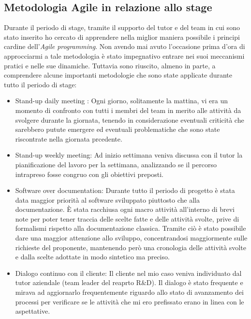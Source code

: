\subsection{Metodologia Agile in relazione allo stage}
Durante il periodo di stage, tramite il supporto del tutor e del team in cui sono stato inserito ho cercato di apprendere nella miglior maniera possibile i principi cardine dell'\textit{Agile programming}. Non avendo mai avuto l'occasione prima d'ora di approcciarmi a tale metodologia è stato impegnativo entrare nei suoi meccanismi pratici e nelle sue dinamiche. Tuttavia sono riuscito, almeno in parte, a comprendere alcune importanti metodologie che sono state applicate durante tutto il periodo di stage:
\begin{itemize}
	\item Stand-up daily meeting : Ogni giorno, solitamente la mattina, vi era un momento di confronto con tutti i membri del team in merito alle attività da svolgere durante la giornata, tenendo in considerazione eventuali criticità che sarebbero putute emergere ed eventuali problematiche che sono state riscontrate nella giornata prcedente.
	\item Stand-up weekly meeting: Ad inizio settimana veniva discussa con il tutor la pianificazione del lavoro per la settimana, analizzando se il percorso intrapreso fosse congruo con gli obiettivi preposti.
	\item Software over documentation: Durante tutto il periodo di progetto è stata data maggior  priorità al software sviluppato piuttosto che alla documentazione. È stata racchiusa ogni macro attività all'interno di brevi note per poter tener traccia delle scelte fatte e delle attività svolte, prive di formalismi rispetto alla documentazione classica. Tramite ciò è stato possibile dare una maggior attenzione allo sviluppo, concentrandosi maggiormente sulle richieste del proponente, mantenendo però una cronologia delle attività svolte e dalla scelte adottate in modo sintetico ma preciso.
	\item Dialogo continuo con il cliente: Il cliente nel mio caso veniva individuato dal tutor aziendale (team leader del reaprto R\&D). Il dialogo è stato frequente e mirava ad aggiornarlo frequentemente riguardo allo stato di avanzamento dei processi per verificare se le attività che mi ero prefissato erano in linea con le aspettative.
\end{itemize}